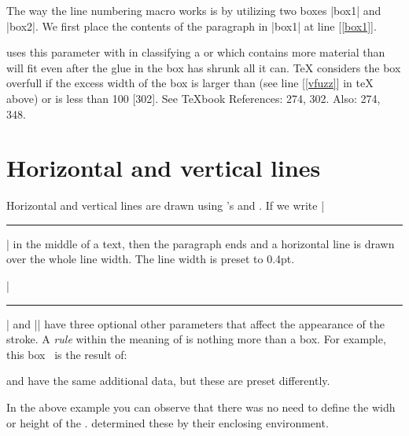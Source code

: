 \begin{teX}
\begin{teX}
\begin{teX}
\begin{teX}
\begin{teX}
\begin{teX}
\NumberParagraph{\lipsum[2]}

\bigskip

The way the line numbering macro works is by utilizing two boxes |box1| and |box2|. We first place the contents of the paragraph in |box1| at line [\ref{box1}]. 



\tex uses this parameter with  in classifying a  or  which contains more material than will fit even after the glue in the box has shrunk all it can. TeX considers the box overfull if the excess width of the box is larger than  (see line [\ref{vfuzz}] in  teX    above) or  is less than 100 [302].
See TeXbook References: 274, 302. Also: 274, 348.

\section{Horizontal and vertical lines}
\normalfont\normalsize

Horizontal and vertical lines are drawn using \tex's  and .
If we write |\hrule| in the  middle of a text, then the paragraph ends and
a horizontal line is drawn over the whole line width. The line width is preset to 0.4pt.

|\hrule| and |\vrule| have three optional other parameters that affect the appearance
of the stroke. A \textit{rule} within the meaning of \tex  is nothing more than a
box. For example, this box \vrule height4pt width3pt depth1pt ~is the result of:

\begin{teX}
\vrule height4pt width3pt  depth1pt 
\end{teX}




 and  have the same additional data, but these are preset
differently.

{

\centering\scalebox{3}{\vrule\,Sample} \scalebox{3}{\vrule\,Subtle}

}

\begin{teX}
  \centering\scalebox{3}{\vrule ~Sample} \scalebox{3}{\vrule  ~Subtle}
\end{teX}

\noindent In the above example you can observe that there was no need to define the widh or height of the . \tex determined these by their enclosing environment.


\end{teX}
\end{teX}
\end{teX}
\end{teX}
\end{teX}
\end{teX}
